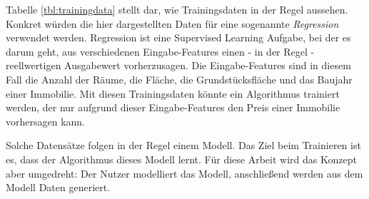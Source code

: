 Tabelle \ref{tbl:trainingdata} stellt dar, wie Trainingsdaten in der Regel aussehen. Konkret würden die hier dargestellten Daten für eine sogenannte \textit{Regression} verwendet werden. Regression ist eine Supervised Learning Aufgabe, bei der es darum geht, aus verschiedenen Eingabe-Features einen - in der Regel - reellwertigen Ausgabewert vorherzusagen. Die Eingabe-Features sind in diesem Fall die Anzahl der Räume, die Fläche, die Grundstücksfläche und das Baujahr einer Immobilie. Mit diesen Trainingsdaten könnte ein Algorithmus trainiert werden, der nur aufgrund dieser Eingabe-Features den Preis einer Immobilie vorhersagen kann.

Solche Datensätze folgen in der Regel einem Modell. Das Ziel beim Trainieren ist es, dass der Algorithmus dieses Modell lernt. Für diese Arbeit wird das Konzept aber umgedreht: Der Nutzer modelliert das Modell, anschließend werden aus dem Modell Daten generiert.